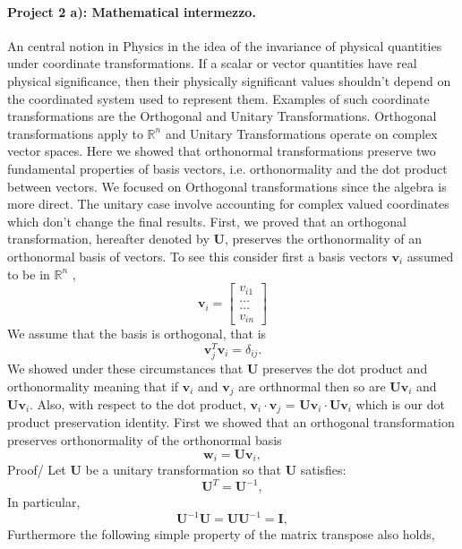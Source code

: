 \documentclass[10pt,showpacs,preprintnumbers,footinbib,amsmath,amssymb,aps,prl,twocolumn,groupedaddress,superscriptaddress,showkeys]{revtex4-1}
\begin{document}
\paragraph{Project 2 a): Mathematical intermezzo.}
An central notion in Physics in the idea of the invariance of physical quantities under coordinate transformations. If a scalar or vector quantities have real physical significance, then their physically significant values shouldn't depend on the coordinated system used to represent them. Examples of such coordinate transformations are the Orthogonal and Unitary Transformations. Orthogonal transformations apply to $\mathbb{R}^n$ and Unitary Transformations operate on complex vector spaces. Here we showed that orthonormal transformations preserve two fundamental properties of basis vectors, i.e. orthonormality and the dot product between vectors. We focused on Orthogonal transformations since the algebra is more direct. The unitary case involve accounting for complex valued coordinates which don't change the final results.  First, we proved that an orthogonal transformation, hereafter denoted by $\mathbf{U}$, preserves  the orthonormality of an orthonormal basis of vectors. To see this consider first a basis vectors $\mathbf{v}_i$ assumed to be in $\mathbb{R}^n$ ,
\[
\mathbf{v}_i = \begin{bmatrix} v_{i1} \\ \dots \\ \dots \\v_{in} \end{bmatrix}
\]
We assume that the basis is orthogonal, that is 
\[
\mathbf{v}_j^T\mathbf{v}_i = \delta_{ij}.
\]
 We showed under these circumstances that $\mathbf{U}$ preserves the dot product and orthonormality meaning that if $\mathbf{v}_i$ and $\mathbf{v}_j$ are orthnormal then so are $\mathbf{U}\mathbf{v}_i$ and $\mathbf{U}\mathbf{v}_i$. Also, with respect to the dot product, $\mathbf{v}_i \cdot \mathbf{v}_j$ = $\mathbf{U}\mathbf{v}_i \cdot \mathbf{U}\mathbf{v}_i$ which is our dot product preservation identity.\newline
First we showed that an orthogonal transformation preserves orthonormality of the orthonormal basis
\[
\mathbf{w}_i=\mathbf{U}\mathbf{v}_i,
\]
Proof/\newline
\newline
Let $\mathbf{U}$ be a unitary transformation so that $\mathbf{U}$ satisfies:
\[
\mathbf{U}^T = \mathbf{U}^{-1},
\]
 In particular,
 \[
\mathbf{U}^{-1} \mathbf{U}  =  \mathbf{U} \mathbf{U}^{-1} = \mathbf{I},
\]
Furthermore the following simple property of the matrix transpose also holds,
\end{document}
